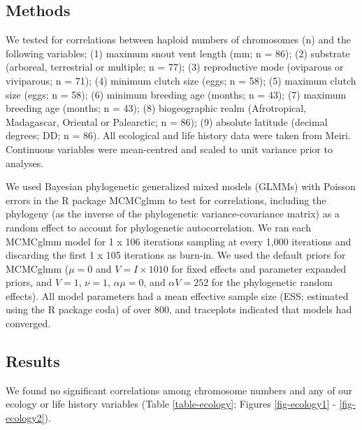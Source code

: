 \documentclass[a4paper, 12pt]{article}
\begin{document}
\subsection{Methods}

We tested for correlations between haploid numbers of chromosomes (n) and the following variables; (1) maximum snout vent length (mm; n = 86); (2) substrate (arboreal, terrestrial or multiple; n = 77); (3) reproductive mode (oviparous or viviparous; n = 71); (4) minimum clutch size (eggs; n = 58); (5) maximum clutch size (eggs; n = 58); (6) minimum breeding age (months; n = 43); (7) maximum breeding age (months; n = 43); (8) biogeographic realm (Afrotropical, Madagascar, Oriental or Palearctic; n = 86); (9) absolute latitude (decimal degrees; DD; n = 86). All ecological and life history data were taken from Meiri\cite{meiri2018traits}. Continuous variables were mean-centred and scaled to unit variance prior to analyses.

We used Bayesian phylogenetic generalized mixed models (GLMMs) with Poisson errors in the R package MCMCglmm\cite{hadfield2010mcmc} to test for correlations, including the phylogeny (as the inverse of the phylogenetic variance-covariance matrix) as a random effect to account for phylogenetic autocorrelation. We ran each MCMCglmm model for 1 x 106 iterations sampling at every 1,000 iterations and discarding the first 1 x 105 iterations as burn-in. We used the default priors for MCMCglmm ($\mu = 0$ and $V = I × 1010$ for fixed effects and parameter expanded priors, and $V = 1$, $\nu = 1$, $\alpha \mu = 0$, and $\alpha V = 252$ for the phylogenetic random effects). All model parameters had a mean effective sample size (ESS; estimated using the R package coda\cite{plummer2006coda}) of over 800, and traceplots indicated that models had converged.

\subsection{Results}

We found no significant correlations among chromosome numbers and any of our ecology or life history variables (Table \ref{table-ecology}; Figures \ref{fig-ecology1} - \ref{fig-ecology2}). 


\end{document}
